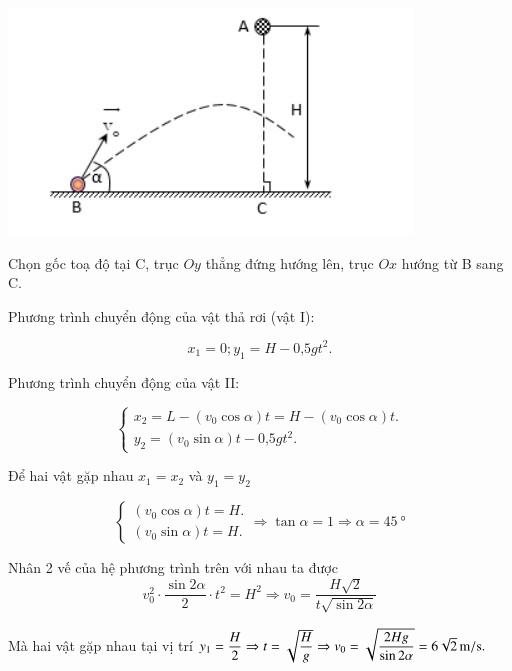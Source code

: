 \begin{enumerate}[label=\bfseries Bài \arabic*:,leftmargin=1.5cm]
{	\begin{center}
		\includegraphics[scale=1]{../figs/VN10-2021-PH-TP014-1.jpg}
	\end{center} 
}

\hideall
{	Chọn gốc toạ độ tại C, trục $Oy$ thẳng đứng hướng lên, trục $Ox$ hướng từ B sang C.
	
	Phương trình chuyển động của vật thả rơi (vật I):
	
	$$x_1 = 0; y_1 = H -\text{0,5}gt^2.$$
	
	Phương trình chuyển động của vật II:
	
	$$\begin{cases}
		x_2 = L  - (v_0 \cos \alpha)t = H - (v_0\cos \alpha)t.\\
		y_2 = (v_0\sin \alpha) t - \text{0,5}gt^2.
	\end{cases}$$
	
	Để hai vật gặp nhau $x_1 = x_2$ và $y_1 = y_2$
	
	$$\begin{cases}
		(v_0\cos \alpha) t = H.\\
		(v_0 \sin \alpha)t = H.
	\end{cases} \Rightarrow \tan \alpha = 1 \Rightarrow \alpha = \SI{45}{\degree}$$
	
	Nhân 2 vế của hệ phương trình trên với nhau ta được
	$$v^2_0\cdot\dfrac{\sin2\alpha}{2}\cdot t^2=H^2 \Rightarrow v_0=\dfrac{H\sqrt{2}}{t\sqrt{\sin2\alpha}}$$
	
	Mà hai vật gặp nhau tại vị trí $y_1=\dfrac{H}{2}\Rightarrow t=\sqrt{\dfrac{H}{g}}\Rightarrow v_0=\sqrt{\dfrac{2Hg}{\sin 2\alpha}} = \xsi{6\sqrt{2}}{m/s}.$
}
\end{enumerate}
